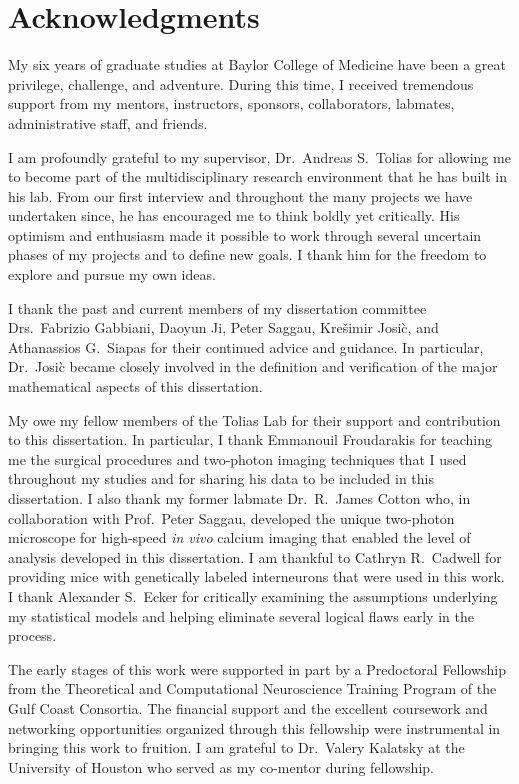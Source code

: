 \documentclass[12pt,letterpaper,titlepage,twoside,openright]{report}
\begin{document}
\chapter*{Acknowledgments}
My six years of graduate studies at Baylor College of Medicine have been a great privilege, challenge, and adventure. During this time, I received tremendous support from my mentors, instructors, sponsors, collaborators, labmates, administrative staff, and friends.

I am profoundly grateful to my supervisor, Dr.\ Andreas S.\ Tolias for allowing me to become part of the multidisciplinary research environment that he has built in his lab. From our first interview and throughout the many projects we have undertaken since, he has encouraged me to think boldly yet critically.  His optimism and enthusiasm made it possible to work through several uncertain phases of my projects and to define new goals.  I thank him for the freedom to explore and pursue my own ideas.

I thank the past and current members of my dissertation committee Drs.\ Fabrizio Gabbiani, Daoyun Ji, Peter Saggau, Kre\v{s}imir Josi\`c, and Athanassios G.\ Siapas  for their continued advice and guidance. In particular, Dr.\ Josi\`c became closely involved in the definition and verification of the major mathematical aspects of this dissertation. 

My owe my fellow members of the Tolias Lab for their support and contribution to this dissertation.  In particular, I thank Emmanouil Froudarakis for teaching me the surgical procedures and two-photon imaging techniques that I used throughout my studies and for sharing his data to be included in this dissertation. I also thank my former labmate Dr.\ R.\ James Cotton who, in collaboration with Prof.~Peter Saggau, developed the unique two-photon microscope for high-speed \emph{in vivo} calcium imaging that enabled the level of analysis developed in this dissertation. I am thankful to Cathryn R.\ Cadwell for providing mice with genetically labeled interneurons that were used in this work. I thank Alexander S.\ Ecker for critically examining the assumptions underlying my statistical models and helping eliminate several logical flaws early in the process. 

The early stages of this  work were supported in part by a Predoctoral Fellowship from the Theoretical and Computational Neuroscience Training Program of the Gulf Coast Consortia.  The financial support and the excellent coursework and networking opportunities organized through this fellowship were instrumental in bringing this work to fruition. I am grateful to Dr.\ Valery Kalatsky at the University of Houston who served as my co-mentor during fellowship.
\end{document}
